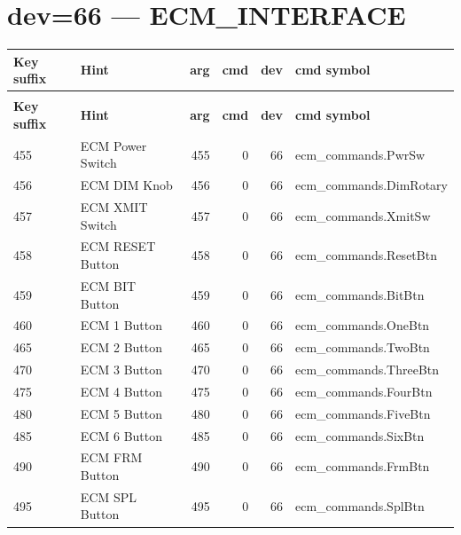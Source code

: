 \documentclass[10pt,a4paper]{article}
\begin{document}
\section{dev=66 — ECM\_INTERFACE}
\begin{longtable}{>{\ttfamily\small}p{38mm} >{\small}p{72mm} r r r >{\ttfamily\small}p{48mm}}
\toprule
\textbf{Key suffix} & \textbf{Hint} & \textbf{arg} & \textbf{cmd} & \textbf{dev} & \textbf{cmd symbol} \\
\midrule
\endfirsthead
\multicolumn{6}{l}{\small\itshape continued\ldots}\\
\toprule
\textbf{Key suffix} & \textbf{Hint} & \textbf{arg} & \textbf{cmd} & \textbf{dev} & \textbf{cmd symbol} \\
\midrule
\endhead
\bottomrule
\endfoot
\rowcolor{rowodd}
  455 & ECM Power Switch & 455 & 0 & 66 & ecm\_commands.PwrSw \\
  456 & ECM DIM Knob & 456 & 0 & 66 & ecm\_commands.DimRotary \\
\rowcolor{rowodd}
  457 & ECM XMIT Switch & 457 & 0 & 66 & ecm\_commands.XmitSw \\
  458 & ECM RESET Button & 458 & 0 & 66 & ecm\_commands.ResetBtn \\
\rowcolor{rowodd}
  459 & ECM BIT Button & 459 & 0 & 66 & ecm\_commands.BitBtn \\
  460 & ECM 1 Button & 460 & 0 & 66 & ecm\_commands.OneBtn \\
\rowcolor{rowodd}
  465 & ECM 2 Button & 465 & 0 & 66 & ecm\_commands.TwoBtn \\
  470 & ECM 3 Button & 470 & 0 & 66 & ecm\_commands.ThreeBtn \\
\rowcolor{rowodd}
  475 & ECM 4 Button & 475 & 0 & 66 & ecm\_commands.FourBtn \\
  480 & ECM 5 Button & 480 & 0 & 66 & ecm\_commands.FiveBtn \\
\rowcolor{rowodd}
  485 & ECM 6 Button & 485 & 0 & 66 & ecm\_commands.SixBtn \\
  490 & ECM FRM Button & 490 & 0 & 66 & ecm\_commands.FrmBtn \\
\rowcolor{rowodd}
  495 & ECM SPL Button & 495 & 0 & 66 & ecm\_commands.SplBtn \\
\end{longtable}
\end{document}
